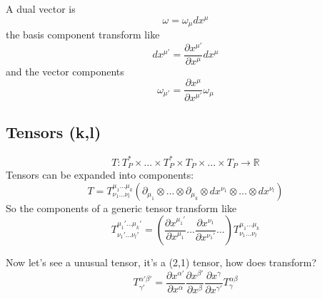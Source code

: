 A dual vector is \[
\omega = \omega_{\mu }dx^{\mu }
\]
the basis component transform like
\[
dx^{\mu '} = \frac{\partial x^{\mu '}}{\partial x^{\mu }} dx^{\mu }
\]
and the vector components
\[
\omega_{\mu '} = \frac{\partial x^{\mu }}{\partial x^{\mu '}}\omega_{\mu }
\]

\subsection{Tensors (k,l)}
\[
T : T_{P}^{*}\times \ldots \times T_{P}^{*} \times T_{P}\times \ldots \times T_{P}\to \mathbb{R}
\]
Tensors can be expanded into components:
\[
T = T^{\mu_{1}\ldots \mu_{k}}_{\nu_{1}\ldots \nu_{l}} \left( \partial_{\mu_{1}} \otimes \ldots \otimes \partial_{\mu_{k}} \otimes dx^{\nu_{1}} \otimes \ldots \otimes dx^{\nu_{l}} \right)
\]
So the components of a generic tensor transform like
\[
T^{\mu_{1}' \ldots \mu_{k}'}_{\nu_{1}' \ldots \nu_{l}'} = \left( \frac{\partial x^{\mu_{1}'}}{\partial x^{\mu_{1}}} \ldots \frac{\partial x^{\nu_{1}}}{\partial x^{\nu_{1}'}}\ldots  \right) T^{\mu_{1}\ldots \mu_{k}}_{\nu_{1}\ldots \nu_{l}}
\]

Now let's see a unusual tensor, it's a (2,1) tensor, how does transform?
\[
T^{\alpha' \beta'}_{\gamma'} = \frac{\partial x^{\alpha '}}{\partial x^{\alpha }} \frac{\partial x^{\beta '}}{\partial x^{\beta }} \frac{\partial x^{\gamma }}{\partial x^{\gamma '}} T^{\alpha \beta }_{\gamma }	 
\]
